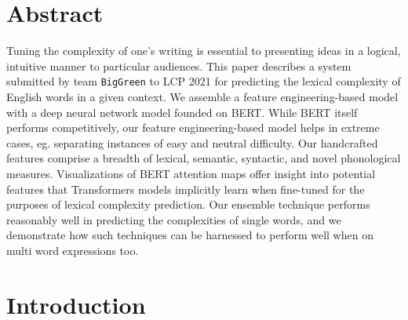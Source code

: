 \documentclass{dcthesis}
\theoremstyle{definition}
\theoremstyle{remark}
\begin{document}
\chapter*{Abstract}
Tuning the complexity of one's writing is essential to presenting ideas in a logical, intuitive manner to particular audiences. This paper describes a system submitted by team \texttt{BigGreen} to LCP 2021 for predicting the lexical complexity of English words in a given context. We assemble a feature engineering-based model with a deep neural network model founded on BERT. While BERT itself performs competitively, our feature engineering-based model helps in extreme cases, eg. separating instances of easy and neutral difficulty. Our handcrafted features comprise a breadth of lexical, semantic, syntactic, and novel phonological measures. Visualizations of BERT attention maps offer insight into potential features that Transformers models implicitly learn when fine-tuned for the purposes of lexical complexity prediction. Our ensemble technique performs reasonably well in predicting the complexities of single words, and we demonstrate how such techniques can be harnessed to perform well when on multi word expressions too.

\tableofcontents



\mainmatter


\chapter{Introduction}
\end{document}
